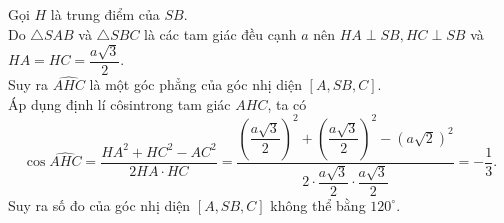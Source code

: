 \begin{ex}
{\begin{itemchoice}
			\itemch Gọi $H$ là trung  điểm của $S B$.\\
			Do $\triangle S A B$ và $\triangle S B C$ là các tam giác đều cạnh $a$ nên $H A \perp S B, H C \perp S B$ và $H A=H C=\dfrac{a \sqrt{3}}{2}$.\\ 
			Suy ra $\widehat{A H C}$ là một góc phẳng của góc  nhị diện $[A, S B, C]$.\\
			Áp dụng định lí  côsintrong tam giác $A H C$, ta có
			 $$
			\cos \widehat{A H C}=\dfrac{H  A^2+H C^2-A C^2}{2 H A \cdot H C}=\dfrac{\left(\dfrac{a \sqrt{3}}{2}\right)^2+\left(\dfrac{a \sqrt{3}}{2}\right)^2-(a \sqrt{2})^2}{2 \cdot \dfrac{a \sqrt{3}}{2} \cdot \dfrac{a \sqrt{3}}{2}}=-\dfrac{1}{3} .
			$$ 
			Suy ra số đo của góc nhị diện $[A,  S B, C]$ không thể bằng $120^{\circ}$.
		\end{itemchoice}
	 }
\end{ex}

